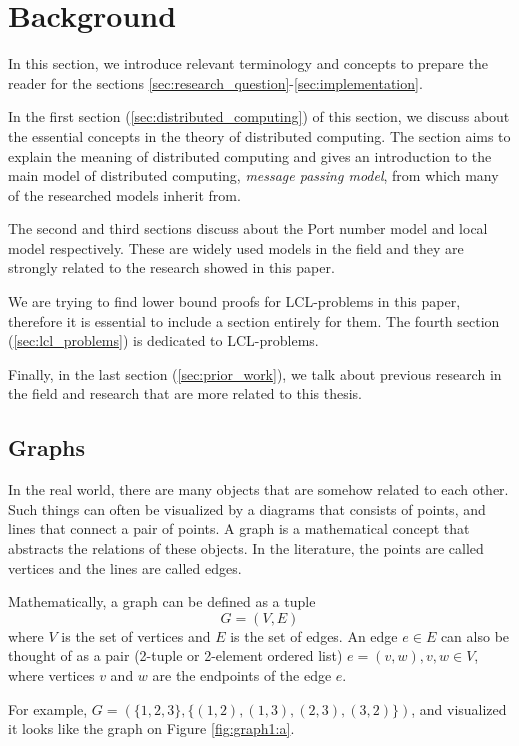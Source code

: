 
\section{Background} \label{sec:background}
In this section, we introduce relevant terminology and concepts to prepare the reader for the sections \ref{sec:research_question}-\ref{sec:implementation}.


In the first section (\ref{sec:distributed_computing}) of this section, we discuss about the essential concepts in the theory of distributed computing.
The section aims to explain the meaning of distributed computing and gives an introduction to the main model of distributed computing, \emph{message passing model}, from which many of the researched models inherit from.

The second and third sections discuss about the Port number model and local model respectively.
These are widely used models in the field and they are strongly related to the research showed in this paper.

We are trying to find lower bound proofs for LCL-problems in this paper, therefore it is essential to include a section entirely for them.
The fourth section (\ref{sec:lcl_problems}) is dedicated to LCL-problems.

Finally, in the last section (\ref{sec:prior_work}), we talk about previous research in the field and research that are more related to this thesis.


\subsection{Graphs} \label{sec:graphs}
In the real world, there are many objects that are somehow related to each other.
Such things can often be visualized by a diagrams that consists of points, and lines that connect a pair of points.
A graph is a mathematical concept that abstracts the relations of these objects.
In the literature, the points are called vertices and the lines are called edges.
\cite{DBLP:books/others/BondyM76}

\begin{definition}
Mathematically, a graph can be defined as a tuple $$G = (V, E)$$ where $V$ is the set of vertices and $E$ is the set of edges.
An edge $e \in E$ can also be thought of as a pair (2-tuple or 2-element ordered list) $e=(v, w), v, w \in V$, where vertices $v$ and $w$ are the endpoints of the edge $e$.
\end{definition}
For example, $G=(\{1, 2, 3\}, \{(1, 2),(1, 3),(2, 3),(3, 2)\})$, and visualized it looks like the graph on Figure \ref{fig:graph1:a}.

